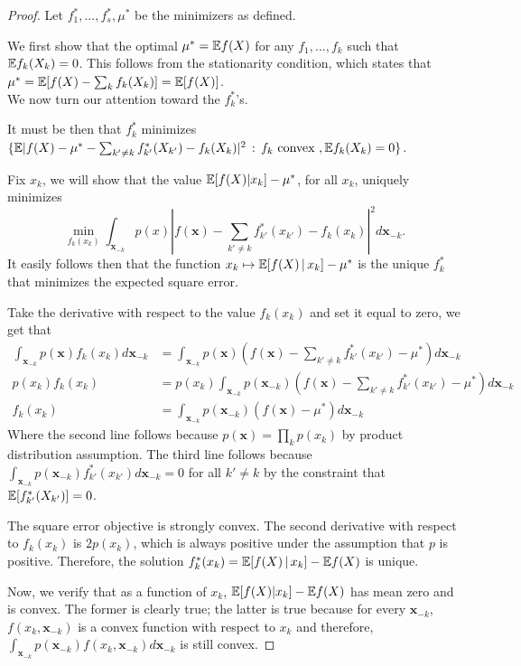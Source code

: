  \begin{proof}
 
Let $f^*_1,...,f^*_s, \mu^*$ be the minimizers as defined. 

We first show that the optimal $\mu^* = {\mathbb E} f(X)$ for any $f_1, ..., f_k$ such that ${\mathbb E} f_k(X_k) = 0$. This follows from the stationarity condition, which states that $\mu^* = {\mathbb E}[ f(X) - \sum_k f_k(X_k)] = {\mathbb E}[ f(X) ]$.\\

We now turn our attention toward the $f^*_k$'s. 

It must be then that $f^*_k$ minimizes $\{ {\mathbb E} | f(X) - \mu^* - \sum_{k' \neq k} f^*_{k'} (X_{k'}) - f_k (X_k)|^2 \,:\, f_k \textrm{ convex }, {\mathbb E} f_k(X_k) = 0 \}$.

Fix $x_k$, we will show that the value ${\mathbb E}[ f(X) | x_k] - \mu^*$, for all $x_k$,  uniquely minimizes 
\[
\min_{ f_k(x_k) } \int_{\mathbf{x}_{-k}} p(x) | f(\mathbf{x}) - \sum_{k' \neq k} f^*_{k'} (x_{k'}) - f_k (x_k)|^2 d \mathbf{x}_{-k}.
\]
It easily follows then that the function $x_k \mapsto {\mathbb E}[ f(X) {\,|\,} x_k] - \mu^*$ is the unique $f^*_k$ that minimizes the expected square error.


Take the derivative with respect to the value $f_k(x_k)$ and set it equal to zero, we get that
\begin{align*}
\int_{\mathbf{x}_{-k}} p(\mathbf{x}) f_k(x_k) d \mathbf{x}_{-k} &= 
  \int_{\mathbf{x}_{-k}} p(\mathbf{x}) 
      ( f(\mathbf{x})-\sum_{k' \neq k} f^*_{k'}(x_{k'})-\mu^*) d \mathbf{x}_{-k} \\  
p(x_k) f_k(x_k) &= p(x_k) \int_{\mathbf{x}_{-k}} 
       p(\mathbf{x}_{-k}) ( f(\mathbf{x}) - \sum_{k' \neq k} f^*_{k'} (x_{k'})-\mu^*) 
              d \mathbf{x}_{-k} \\
f_k(x_k) &= \int_{\mathbf{x}_{-k}} 
       p(\mathbf{x}_{-k}) (f(\mathbf{x}) -\mu^*) d \mathbf{x}_{-k} 
 \end{align*}
Where the second line follows because $p(\mathbf{x}) = \prod_k p(x_k)$ by product distribution assumption. The third line follows because $\int_{\mathbf{x}_{-k}} p(\mathbf{x}_{-k}) f^*_{k'}(x_{k'}) d\mathbf{x}_{-k} = 0$ for all $k' \neq k$ by the constraint that ${\mathbb E}[f^*_{k'}(X_{k'})] = 0$. 

The square error objective is strongly convex. The second derivative with respect to $f_k(x_k)$ is $2 p(x_k)$, which is always positive under the assumption that $p$ is positive. Therefore, the solution $f^*_k(x_k) = {\mathbb E}[ f(X) {\,|\,} x_k ] - {\mathbb E} f(X)$ is unique.


Now, we verify that as a function of $x_k$, ${\mathbb E}[ f(X) | x_k] - {\mathbb E} f(X)$ has mean zero and is convex. The former is clearly true; the latter is true because for every $\mathbf{x}_{-k}$, $f(x_k, \mathbf{x}_{-k})$ is a convex function with respect to $x_k$ and therefore, $\int_{\mathbf{x}_{-k}} p(\mathbf{x}_{-k}) f(x_k, \mathbf{x}_{-k}) d \mathbf{x}_{-k}$ is still convex. 
 
 \end{proof}
 
